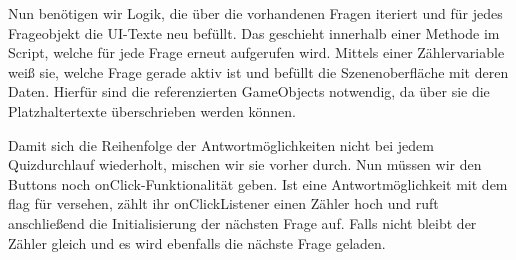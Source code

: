 Nun benötigen wir Logik, die über die vorhandenen Fragen iteriert und für jedes Frageobjekt die UI-Texte neu befüllt. Das geschieht innerhalb einer Methode im Script, welche für jede Frage erneut aufgerufen wird. 
Mittels einer Zählervariable weiß sie, welche Frage gerade aktiv ist und befüllt die Szenenoberfläche mit deren Daten.
Hierfür sind die referenzierten GameObjects notwendig, da über sie die Platzhaltertexte überschrieben werden können. 

Damit sich die Reihenfolge der Antwortmöglichkeiten nicht bei jedem Quizdurchlauf wiederholt, mischen wir sie vorher durch. 
Nun müssen wir den Buttons noch onClick-Funktionalität geben. 
Ist eine Antwortmöglichkeit mit dem flag für  versehen, zählt ihr onClickListener einen Zähler hoch und ruft anschließend die Initialisierung der nächsten Frage auf. 
Falls nicht bleibt der Zähler gleich und es wird ebenfalls die nächste Frage geladen.